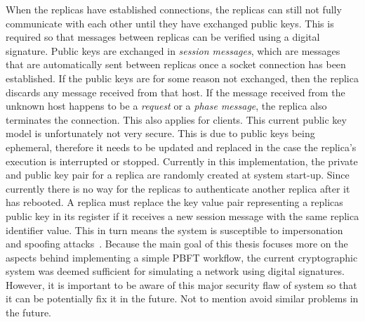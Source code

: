 When the replicas have established connections, the replicas can still not fully communicate with each other until they have exchanged public keys. This is required so that messages between replicas can be verified using a digital signature. Public keys are exchanged in \emph{session messages}, which are messages that are automatically sent between replicas once a socket connection has been established. If the public keys are for some reason not exchanged, then the replica discards any message received from that host. If the message received from the unknown host happens to be a \emph{request} or a \emph{phase message}, the replica also terminates the connection. This also applies for clients. This current public key model is unfortunately not very secure. This is due to public keys being ephemeral, therefore it needs to be updated and replaced in the case the replica’s execution is interrupted or stopped. Currently in this implementation, the private and public key pair for a replica are randomly created at system start-up. Since currently there is no way for the replicas to authenticate another replica after it has rebooted. A replica must replace the key value pair representing a replicas public key in its register if it receives a new session message with the same replica identifier value. This in turn means the system is susceptible to impersonation and spoofing attacks~\cite{ WEB:spoofingAttack}. Because the main goal of this thesis focuses more on the aspects behind implementing a simple PBFT workflow, the current cryptographic system was deemed sufficient for simulating a network using digital signatures. However, it is important to be aware of this major security flaw of system so that it can be potentially fix it in the future. Not to mention avoid similar problems in the future.

